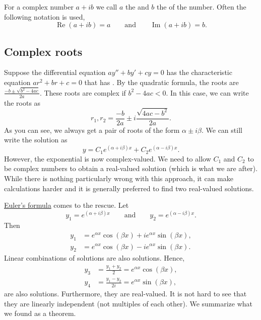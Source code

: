 For a complex number $a+ib$ we call
$a$ the \emph{} and $b$ the \emph{} of the number.
Often the following notation is used,
\begin{equation*}
\operatorname{Re}(a+ib) = a
\qquad \text{and} \qquad
\operatorname{Im}(a+ib) = b.
\end{equation*}

\subsection{Complex roots}

Suppose the differential equation $ay'' + by' + cy = 0$ has the 
characteristic equation
$a r^2 + b r + c = 0$ that has .
By the quadratic
formula, the roots are
$\frac{-b \pm \sqrt{b^2 - 4ac}}{2a}$.
These roots are complex if $b^2 - 4ac < 0$.  In this case, we
can write the roots as
\begin{equation*}
r_1, r_2 = \frac{-b}{2a} \pm i\frac{\sqrt{4ac - b^2}}{2a} .
\end{equation*}
As you can see, we always get a pair of roots of the form $\alpha \pm i
\beta$.  We can still write the solution as
\begin{equation*}
y = C_1 e^{(\alpha+i\beta)x} + C_2 e^{(\alpha-i\beta)x} .
\end{equation*}
However, the exponential is now complex-valued.  We need to allow
$C_1$ and $C_2$ to be complex numbers to obtain a real-valued solution (which
is what we are after).  While there is nothing particularly wrong with this
approach,
it can make calculations harder and it is generally preferred
to find two real-valued
solutions.

\hyperref[eulersformula]{Euler's formula} comes to the rescue.  Let
\begin{equation*}
y_1 = e^{(\alpha+i\beta)x} \qquad \text{and} \qquad y_2 = e^{(\alpha-i\beta)x} .
\end{equation*}
Then 
\begin{equation*}
\begin{aligned}
y_1 & = e^{\alpha x} \cos (\beta x) + i e^{\alpha x} \sin (\beta x) , \\
y_2 & = e^{\alpha x} \cos (\beta x) - i e^{\alpha x} \sin (\beta x) .
\end{aligned}
\end{equation*}
Linear combinations of solutions are also solutions.  Hence,
\begin{equation*}
\begin{aligned}
y_3 & = \frac{y_1 + y_2}{2} = e^{\alpha x} \cos (\beta x) , \\ 
y_4 & = \frac{y_1 - y_2}{2i} = e^{\alpha x} \sin (\beta x) ,
\end{aligned}
\end{equation*}
are also solutions.  Furthermore, they are real-valued.  It is not hard to
see that they are linearly independent (not multiples of each other).
We summarize what we found as
a theorem.

